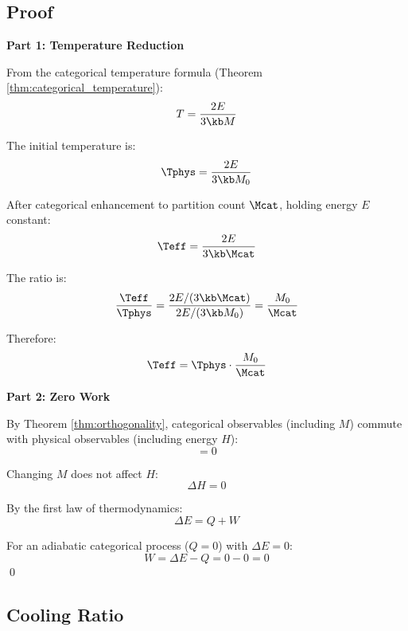 \subsection{Proof}

\textbf{Part 1: Temperature Reduction}

From the categorical temperature formula (Theorem \ref{thm:categorical_temperature}):
\begin{equation}
T = \frac{2E}{3\kb M}
\end{equation}

The initial temperature is:
\begin{equation}
\Tphys = \frac{2E}{3\kb M_0}
\end{equation}

After categorical enhancement to partition count $\Mcat$, holding energy $E$ constant:
\begin{equation}
\Teff = \frac{2E}{3\kb \Mcat}
\end{equation}

The ratio is:
\begin{equation}
\frac{\Teff}{\Tphys} = \frac{2E/(3\kb \Mcat)}{2E/(3\kb M_0)} = \frac{M_0}{\Mcat}
\end{equation}

Therefore:
\begin{equation}
\Teff = \Tphys \cdot \frac{M_0}{\Mcat}
\end{equation}

\textbf{Part 2: Zero Work}

By Theorem \ref{thm:orthogonality}, categorical observables (including $M$) commute with physical observables (including energy $H$):
\begin{equation}
[M, H] = 0
\end{equation}

Changing $M$ does not affect $H$:
\begin{equation}
\Delta H = 0
\end{equation}

By the first law of thermodynamics:
\begin{equation}
\Delta E = Q + W
\end{equation}

For an adiabatic categorical process ($Q = 0$) with $\Delta E = 0$:
\begin{equation}
W = \Delta E - Q = 0 - 0 = 0
\end{equation}
\qed

\subsection{Cooling Ratio}

